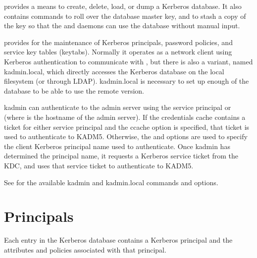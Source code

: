 \documentclass[letterpaper,10pt,english]{sphinxmanual}
\begin{document}
{\hyperref[\detokenize{admin/admin_commands/kdb5_util:kdb5-util-8}]{}} provides a means to create, delete, load, or dump
a Kerberos database.  It also contains commands to roll over the
database master key, and to stash a copy of the key so that the
{\hyperref[\detokenize{admin/admin_commands/kadmind:kadmind-8}]{}} and {\hyperref[\detokenize{admin/admin_commands/krb5kdc:krb5kdc-8}]{}} daemons can use the database
without manual input.

{\hyperref[\detokenize{admin/admin_commands/kadmin_local:kadmin-1}]{}} provides for the maintenance of Kerberos principals,
password policies, and service key tables (keytabs).  Normally it
operates as a network client using Kerberos authentication to
communicate with {\hyperref[\detokenize{admin/admin_commands/kadmind:kadmind-8}]{}}, but there is also a variant, named
kadmin.local, which directly accesses the Kerberos database on the
local filesystem (or through LDAP).  kadmin.local is necessary to set
up enough of the database to be able to use the remote version.

kadmin can authenticate to the admin server using the service
principal  or  (where  is the
hostname of the admin server).  If the credentials cache contains a
ticket for either service principal and the  ccache option is
specified, that ticket is used to authenticate to KADM5.  Otherwise,
the  and  options are used to specify the client Kerberos
principal name used to authenticate.  Once kadmin has determined the
principal name, it requests a  Kerberos service ticket
from the KDC, and uses that service ticket to authenticate to KADM5.

See {\hyperref[\detokenize{admin/admin_commands/kadmin_local:kadmin-1}]{}} for the available kadmin and kadmin.local
commands and options.


\section{Principals}
\label{\detokenize{admin/database:principals}}\label{\detokenize{admin/database:id1}}
Each entry in the Kerberos database contains a Kerberos principal and
the attributes and policies associated with that principal.
\end{document}

